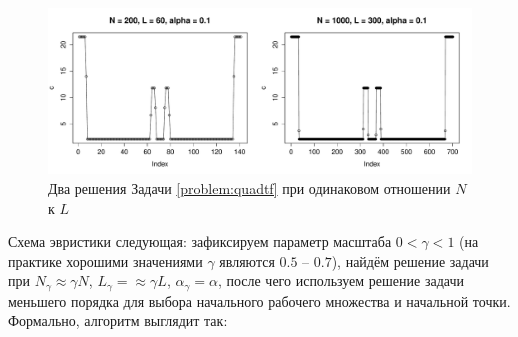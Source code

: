\documentclass[10pt]{article}
\begin{document}
\begin{figure}[!hhh]
	\includegraphics[width = \columnwidth]{scale.pdf}
	\caption{Два решения Задачи \ref{problem:quadtf} при одинаковом отношении $N$ к $L$}
	\label{img:scale}
\end{figure}

Схема эвристики следующая: зафиксируем параметр масштаба $0 < \gamma < 1$ (на практике хорошими значениями $\gamma$ являются $0.5$ -- $0.7$), найдём решение задачи при $N_\gamma \approx \gamma N$, $L_\gamma = \approx \gamma L$, $\alpha_\gamma = \alpha$, после чего используем решение задачи меньшего порядка для выбора начального рабочего множества и начальной точки. Формально, алгоритм выглядит так:
\end{document}
